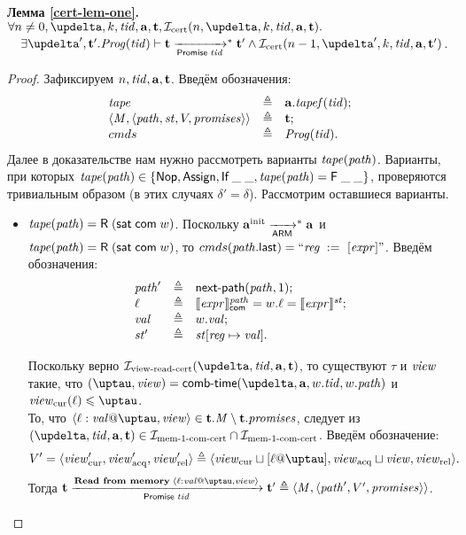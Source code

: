 \noindent \textbf{Лемма \ref{cert-lem-one}.}
$\forall n \not = 0, \delta, k, \tId, \aT, \tT, \invCert(n, \delta, k, \tId, \aT, \tT).$ \\
${} \quad \exists \delta', \tT'. \Cfprom(\tId) \vdash \tT \promTStep^{*} \tT' \land \invCert(n - 1, \delta', k, \tId, \aT, \tT')$.
\begin{proof}
  Зафиксируем $n, \mathit{tid}, \mathbf{a}, \mathbf{t}$. Введём обозначения:
  \[\begin{array}{l c l}
  \mathit{tape} & \triangleq & \mathbf{a}.\mathit{tapef}(\mathit{tid}); \\
  \langle \mathit{M}, \langle \mathit{path}, \mathit{st}, V, \mathit{promises} \rangle \rangle & \triangleq & \mathbf{t}; \\
  {cmds} & \triangleq & \mathit{Prog}(\mathit{tid}). \\
  \end{array}\]
  Далее в доказательстве нам нужно рассмотреть варианты $\mathit{tape}(\mathit{path})$.
  Варианты, при которых $\mathit{tape}(\mathit{path}) \in \{\textsf{Nop}, \textsf{Assign}, \textsf{If} \; \_ \; \_, \mathit{tape}(\mathit{path}) = \textsf{F} \; \_ \; \_\}$,
  проверяются тривиальным образом (в этих случаях $\delta' = \delta$).
  Рассмотрим оставшиеся варианты.
  \begin{itemize}
    \item $\mathit{tape}(\mathit{path}) = \textsf{R} \; (\mathsf{sat} \; \mathsf{com} \; w)$.
      Поскольку $\mathbf{a}^{\rm init} \xrightarrow[\mathsf{ARM}]{}^{*} \mathbf{a}$ и $\mathit{tape}(\mathit{path}) = \textsf{R} \; (\mathsf{sat} \; \mathsf{com} \; w)$,
      то ${cmds}(\mathit{path}.\textup{\sf last}) = ``\mathit{reg} \;:=_{}\;[\mathit{expr}]"$.
      Введём обозначения:
      \[\begin{array}{l l l}
        \mathit{path}'    & \triangleq & \mathsf{next}\textsf{-}\mathsf{path}(\mathit{path}, 1); \\
        \ell       & \triangleq & \llbracket\mathit{expr}\rrbracket ^{\mathit{path}}_\mathsf{com} = w.\ell = \llbracket\mathit{expr}\rrbracket ^{\mathit{st}}; \\
        \mathit{val}  & \triangleq & w.\mathit{val}; \\
        \mathit{st}' & \triangleq & \mathit{st}[\mathit{reg} \mapsto \mathit{val}]. \\
      \end{array}\]
      
      Поскольку верно $\invViewReadCERT(\delta, \tId, \aT, \tT)$, то существуют $\tau$ и $\mathit{view}$ такие, что 
      $(\tau, \R) = \deltaHmap(\delta, \aT, \w.\tId, \w.\cpath)$ и
      $\Rcur(\loc) \le \tau$. \\
      То, что $\writeEvt{\loc}{\stval}{\tau}{\R} \in \tT.\Mprom \setminus \tT.\PromSet$,
      следует из $(\delta, \tId, \aT, \tT) \in \invMemOneCERT \cap \invMemOneCERT$.
      Введём обозначение:
      \[\V' = \angled{\Rcur', \Racq', \Rrel'} \triangleq \angled{\Rcur \sqcup [\loc@\tau], \Racq \sqcup \R, \Rrel}.\]
      Тогда $\tT \promTStepReadLoc \tT' \triangleq \angled{\Mprom, \angled{\cpath', \V', \PromSet}}$.
      

\end{itemize}
\end{proof}

